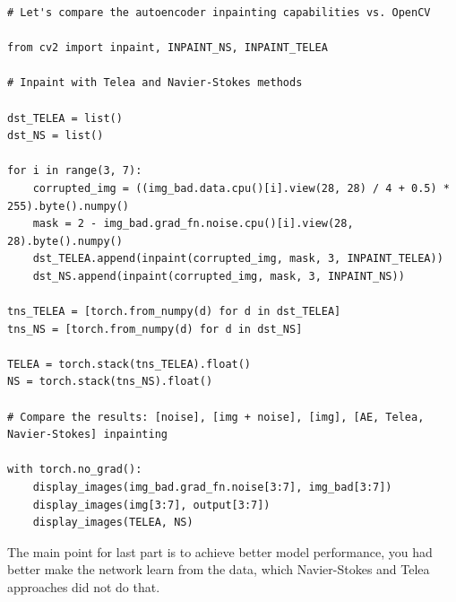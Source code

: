 \begin{verbatim}
# Let's compare the autoencoder inpainting capabilities vs. OpenCV

from cv2 import inpaint, INPAINT_NS, INPAINT_TELEA

# Inpaint with Telea and Navier-Stokes methods

dst_TELEA = list()
dst_NS = list()

for i in range(3, 7):
    corrupted_img = ((img_bad.data.cpu()[i].view(28, 28) / 4 + 0.5) * 255).byte().numpy()
    mask = 2 - img_bad.grad_fn.noise.cpu()[i].view(28, 28).byte().numpy()
    dst_TELEA.append(inpaint(corrupted_img, mask, 3, INPAINT_TELEA))
    dst_NS.append(inpaint(corrupted_img, mask, 3, INPAINT_NS))

tns_TELEA = [torch.from_numpy(d) for d in dst_TELEA]
tns_NS = [torch.from_numpy(d) for d in dst_NS]

TELEA = torch.stack(tns_TELEA).float()
NS = torch.stack(tns_NS).float()

# Compare the results: [noise], [img + noise], [img], [AE, Telea, Navier-Stokes] inpainting

with torch.no_grad():
    display_images(img_bad.grad_fn.noise[3:7], img_bad[3:7])
    display_images(img[3:7], output[3:7])
    display_images(TELEA, NS)
\end{verbatim}

The main point for last part is to achieve better model performance, you had better make the network learn from the data, which Navier-Stokes and Telea approaches did not do that.